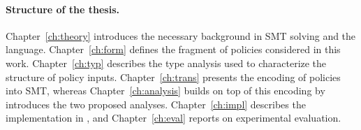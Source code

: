 \paragraph{Structure of the thesis.}
Chapter~\ref{ch:theory} introduces the necessary background in SMT solving and the \rego language. Chapter~\ref{ch:form} defines the fragment of \rego policies considered in this work. Chapter~\ref{ch:typ} describes the type analysis used to characterize the structure of policy inputs. Chapter~\ref{ch:trans} presents the encoding of \rego policies into SMT, whereas Chapter~\ref{ch:analysis} builds on top of this encoding by introduces the two proposed analyses. Chapter~\ref{ch:impl} describes the implementation in \verirego, and Chapter~\ref{ch:eval} reports on experimental evaluation.
